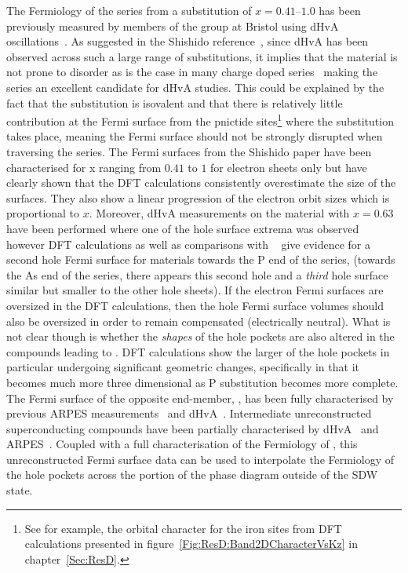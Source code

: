 The Fermiology of the \BaFeAsP{} series from a substitution of $x=0.41$--$1.0$ has been previously measured by members of the group at Bristol using dHvA oscillations~\cite{Shishido2010}. As suggested in the Shishido reference~\cite{Shishido2010}, since dHvA has been observed across such a large range of substitutions, it implies that the material is not prone to disorder as is the case in many charge doped series~\cite{VanderBeek2010} making the series an excellent candidate for dHvA studies. This could be explained by the fact that the substitution is isovalent and that there is relatively little contribution at the Fermi surface from the pnictide sites\footnote{See for example, the orbital character for the iron sites from \ac{DFT} calculations presented in figure~\ref{Fig:ResD:Band2DCharacterVsKz} in chapter~\ref{Sec:ResD}.} where the substitution takes place, meaning the Fermi surface should not be strongly disrupted when traversing the series. The Fermi surfaces from the Shishido paper have been characterised for x ranging from $0.41$ to $1$ for electron sheets only but have clearly shown that the DFT calculations consistently overestimate the size of the surfaces. They also show a linear progression of the electron orbit sizes which is proportional to $x$. Moreover, dHvA measurements on the material with $x=0.63$ have been performed where one of the hole surface extrema was observed~\cite{Analytis2010c} however DFT calculations as well as comparisons with \SrFeP~\cite{Analytis2009} give evidence for a second hole Fermi surface for materials towards the P end of the series, (towards the As end of the series, there appears this second hole and a \emph{third} hole surface similar but smaller to the other hole sheets). If the electron Fermi surfaces are oversized in the DFT calculations, then the hole Fermi surface volumes should also be oversized in order to remain compensated (electrically neutral). What is not clear though is whether the \emph{shapes} of the hole pockets are also altered in the compounds leading to \BaFeP. DFT calculations show the larger of the hole pockets in particular undergoing significant geometric changes, specifically in that it becomes much more three dimensional as P substitution becomes more complete. The Fermi surface of the opposite end-member, \BaFeAs, has been fully characterised by previous \ac{ARPES} measurements~\cite{Kondo2010a} and dHvA~\cite{Terashima2011, Analytis2010b}. Intermediate unreconstructed superconducting compounds have been partially characterised by \ac{dHvA}~\cite{Analytis2010c} and \ac{ARPES}~\cite{Yoshida2010}. Coupled with a full characterisation of the Fermiology of \BaFeP, this unreconstructed Fermi surface data can be used to interpolate the Fermiology of the hole pockets across the portion of the phase diagram outside of the \ac{SDW} state.

